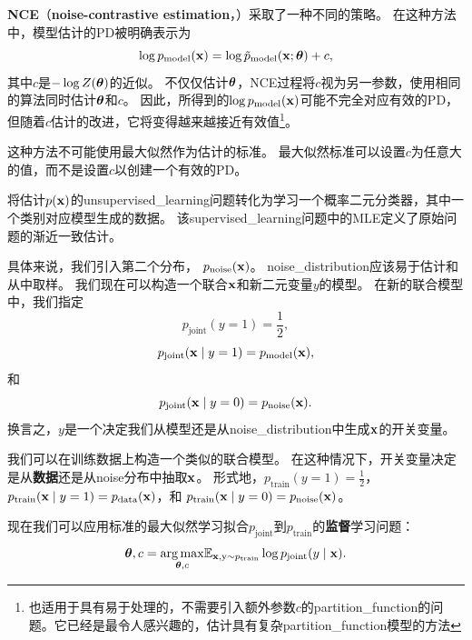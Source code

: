 \textbf{\gls{NCE}}（\textbf{noise-contrastive estimation}，）\citep{Gutmann+Hyvarinen-2010}采取了一种不同的策略。
 在这种方法中，模型估计的\gls{PD}被明确表示为
\begin{equation}
	\log p_{\text{model}} (\mathbf{x}) = \log \tilde{p}_{\text{model}} (\mathbf{x}; \boldsymbol{\theta}) + c,
\end{equation}
其中$c$是$-\log Z(\boldsymbol{\theta})$的近似。
不仅仅估计$\boldsymbol{\theta}$，\gls{NCE}过程将$c$视为另一参数，使用相同的算法同时估计$\boldsymbol{\theta}$和$c$。
因此，所得到的$\log p_{\text{model}}(\mathbf{x})$可能不完全对应有效的\gls{PD}，但随着$c$估计的改进，它将变得越来越接近有效值\footnote{也适用于具有易于处理的，不需要引入额外参数$c$的\gls{partition_function}的问题。它已经是最令人感兴趣的，估计具有复杂\gls{partition_function}模型的方法}。


这种方法不可能使用最大似然作为估计的标准。
最大似然标准可以设置$c$为任意大的值，而不是设置$c$以创建一个有效的\gls{PD}。


将估计$p(\mathbf{x})$的\gls{unsupervised_learning}问题转化为学习一个概率二元分类器，其中一个类别对应模型生成的数据。
该\gls{supervised_learning}问题中的\gls{MLE}定义了原始问题的渐近一致估计。


具体来说，我们引入第二个分布， $p_{\text{noise}}(\mathbf{x})$。
\gls{noise_distribution}应该易于估计和从中取样。
我们现在可以构造一个联合$\mathbf{x}$和新二元变量$y$的模型。
在新的联合模型中，我们指定
\begin{equation}
	p_{\text{joint}} (y = 1) = \frac{1}{2},
\end{equation}
\begin{equation}
	p_{\text{joint}} (\mathbf{x} \mid y = 1) = p_{\text{model}} (\mathbf{x}),
\end{equation}
和
\begin{equation}
	p_{\text{joint}} (\mathbf{x} \mid y = 0) = p_{\text{noise}}(\mathbf{x}).
\end{equation}
换言之，$y$是一个决定我们从模型还是从\gls{noise_distribution}中生成$\mathbf{x}$的开关变量。


我们可以在训练数据上构造一个类似的联合模型。
在这种情况下，开关变量决定是从\textbf{数据}还是从\gls{noise}分布中抽取$\mathbf{x}$。
形式地，$p_{\text{train}}(y = 1) = \frac{1}{2}$，$p_{\text{train}}( \mathbf{x} \mid y = 1) = p_{\text{data}}( \mathbf{x})$，和
$p_{\text{train}}(\mathbf{x} \mid y = 0) = p_{\text{noise}}(\mathbf{x})$。


现在我们可以应用标准的最大似然学习拟合$p_{\text{joint}}$到$p_{\text{train}}$的\textbf{监督}学习问题：
\begin{equation}
	\boldsymbol{\theta}, c = \underset{ \boldsymbol{\theta}, c}{\arg\max} \mathbb{E}_{\mathbf{x}, \mathrm{y} \sim p_{\text{train}}} \log 
	p_{\text{joint}} (y \mid \mathbf{x}).
\end{equation}


